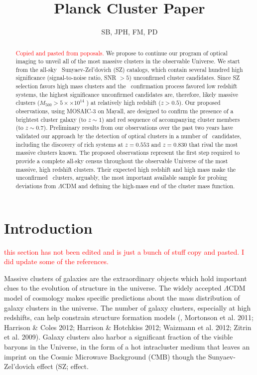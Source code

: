 \documentclass[apj, revtex4-1]{emulateapj}
\newcommand{\editorial}[1]{\textcolor{red}{#1}}
\begin{document}
\title{Planck Cluster Paper}

\author{\sc SB, JPH, FM, PD}


\begin{abstract}
	\noindent \editorial{Copied and pasted from poposals.} We propose to continue our program of optical imaging to unveil all of the most massive clusters in	the observable Universe. We start from the all-sky \planck\ Sunyaev-Zel’dovich (SZ) catalogs, which contain several hundred high significance (signal-to-noise ratio, SNR $> 5$) unconfirmed cluster candidates. Since SZ selection favors high mass clusters and the \planck\ confirmation process favored	low redshift systems, the highest significance unconfirmed candidates are, therefore, likely massive clusters ($M_{500} > 5 ×\times 10^{14}$ \Msol) at relatively high redshift ($z > 0.5$). Our proposed observations,	using MOSAIC-3 on Mayall, are designed to confirm the presence of a brightest cluster galaxy (to $z \sim 1$) and red sequence of accompanying cluster members (to $z \sim 0.7$). Preliminary results from our observations over the past two years have validated our approach by the detection of optical clusters in a number of \planck\ candidates, including the discovery of rich systems at $z = 0.553$ and $z = 0.830$ that rival the most massive clusters known. The proposed observations represent the first step required to provide a complete all-sky census throughout the observable Universe of the most massive, high redshift clusters. Their expected high redshift and high mass make the unconfirmed \planck\ clusters, arguably, the most important available sample for probing deviations from $\Lambda$CDM and defining the high-mass end of the cluster mass function.
\end{abstract}

\section{Introduction}
\editorial{this section has not been edited and is just a bunch of stuff copy and pasted. I did update some of the references.}

Massive clusters of galaxies are the extraordinary objects which hold important clues to the evolution of structure in the universe. The widely accepted $\Lambda$CDM model of cosmology makes specific predictions about the mass distribution of galaxy clusters in the universe. The number of galaxy clusters, especially at high redshifts, can help constrain structure formation models (\eg, Mortonson et al. 2011; Harrison \& Coles 2012; Harrison \& Hotchkiss 2012; Waizmann et al. 2012; Zitrin et al. 2009). Galaxy clusters also harbor a significant fraction of the visible baryons in the Universe, in the form of a hot intracluster medium that leaves an imprint on the Cosmic Microwave Background (CMB) though the Sunyaev-Zel'dovich effect (SZ; \citealt{Sunyaev1972} effect.
\end{document}
